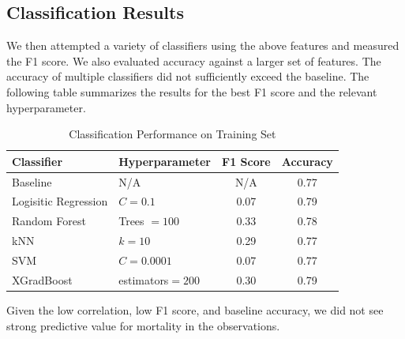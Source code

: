 \documentclass[letterpaper]{article}
\begin{document}
\begin{appendices}
\subsection{Classification Results}

We then attempted a variety of classifiers using the above features and measured the F1 score. 
We also evaluated accuracy against a larger set of features. The accuracy of multiple classifiers
did not sufficiently exceed the baseline.
The following table summarizes the results for the best F1 score and the relevant hyperparameter.

\begin{table}[H]
\label{table:classifier}
\caption{Classification Performance on Training Set}
\centering
\begin{tabular}{|l|l|c|c|}
\hline
Classifier & Hyperparameter & F1 Score & Accuracy \\ \hline
Baseline & N/A & N/A & 0.77 \\
Logisitic Regression & $C=0.1$ & 0.07 & 0.79 \\ 
Random Forest & Trees $= 100$  & 0.33 & 0.78 \\ 
kNN & $k=10$ & 0.29 & 0.77 \\ 
SVM & $C=0.0001$ & 0.07 & 0.77\\
XGradBoost & estimators$=200$ & 0.30 & 0.79 \\
\hline
\end{tabular}
\end{table}

Given the low correlation, low F1 score, and baseline accuracy, we did not see strong
predictive value for mortality in the observations.


\end{appendices}




\end{document}
